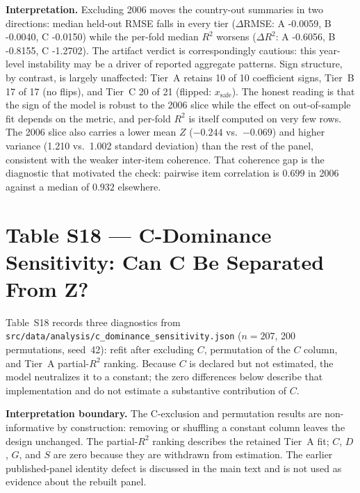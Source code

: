 \documentclass[11pt]{article}
\begin{document}
\noindent\justifying
\textbf{Interpretation.} Excluding 2006 moves the country-out summaries in two directions: median held-out RMSE falls in every tier ($\Delta$RMSE: A -0.0059, B -0.0040, C -0.0150) while the per-fold median $R^2$ worsens ($\Delta R^2$: A -0.6056, B -0.8155, C -1.2702). The artifact verdict is correspondingly cautious: this year-level instability may be a driver of reported aggregate patterns. Sign structure, by contrast, is largely unaffected: Tier~A retains 10 of 10 coefficient signs, Tier~B 17 of 17 (no flips), and Tier~C 20 of 21 (flipped: $x_{\text{safe}}$). The honest reading is that the sign of the model is robust to the 2006 slice while the effect on out-of-sample fit depends on the metric, and per-fold $R^2$ is itself computed on very few rows. The 2006 slice also carries a lower mean $Z$ ($-0.244$ vs.\ $-0.069$) and higher variance (1.210 vs.\ 1.002 standard deviation) than the rest of the panel, consistent with the weaker inter-item coherence. That coherence gap is the diagnostic that motivated the check: pairwise item correlation is $0.699$ in 2006 against a median of $0.932$ elsewhere.

\section*{Table S18 --- C-Dominance Sensitivity: Can C Be Separated From Z?}

\noindent\justifying
Table~S18 records three diagnostics from \nolinkurl{src/data/analysis/c_dominance_sensitivity.json} ($n=207$, 200 permutations, seed~42): refit after excluding $C$, permutation of the $C$ column, and Tier~A partial-$R^2$ ranking. Because $C$ is declared but not estimated, the model neutralizes it to a constant; the zero differences below describe that implementation and do not estimate a substantive contribution of $C$.

\noindent\justifying
\textbf{Interpretation boundary.} The C-exclusion and permutation results are non-informative by construction: removing or shuffling a constant column leaves the design unchanged. The partial-$R^2$ ranking describes the retained Tier~A fit; $C$, $D$, $G$, and $S$ are zero because they are withdrawn from estimation. The earlier published-panel identity defect is discussed in the main text and is not used as evidence about the rebuilt panel.
\end{document}
